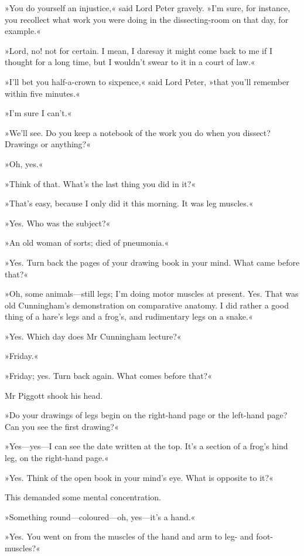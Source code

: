 »You do yourself an injustice,« said Lord Peter gravely. »I'm sure, for instance, you recollect what work you were doing in the dissecting-room on that day, for example.«

»Lord, no! not for certain. I mean, I daresay it might come back to me if I thought for a long time, but I wouldn't swear to it in a court of law.«

»I'll bet you half-a-crown to sixpence,« said Lord Peter, »that you'll remember within five minutes.«

»I'm sure I can't.«

»We'll see. Do you keep a notebook of the work you do when you dissect? Drawings or anything?«

»Oh, yes.«

»Think of that. What's the last thing you did in it?«

»That's easy, because I only did it this morning. It was leg muscles.«

»Yes. Who was the subject?«

»An old woman of sorts; died of pneumonia.«

»Yes. Turn back the pages of your drawing book in your mind. What came before that?«

»Oh, some animals\allowbreak---\allowbreak still legs; I'm doing motor muscles at present. Yes. That was old Cunningham's demonstration on comparative anatomy. I did rather a good thing of a hare's legs and a frog's, and rudimentary legs on a snake.«

»Yes. Which day does Mr Cunningham lecture?«

»Friday.«

»Friday; yes. Turn back again. What comes before that?«

Mr Piggott shook his head.

»Do your drawings of legs begin on the right-hand page or the left-hand page? Can you see the first drawing?«

»Yes\allowbreak---\allowbreak yes---I can see the date written at the top. It's a section of a frog's hind leg, on the right-hand page.«

»Yes. Think of the open book in your mind's eye. What is opposite to it?«

This demanded some mental concentration.

»Something round\allowbreak---\allowbreak coloured---oh, yes\allowbreak---\allowbreak it's a hand.«

»Yes. You went on from the muscles of the hand and arm to leg- and foot-muscles?«

